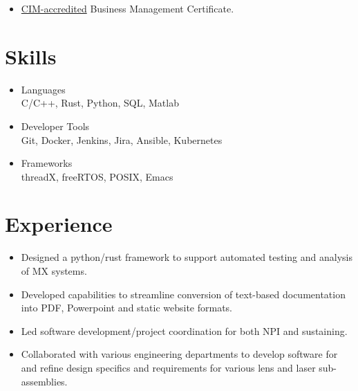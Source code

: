 \documentclass[a4paper,ragged2e,withhyper]{altacv}
\begin{document}
{\begin{itemize}
\item \href{https://acbsp.org/?}{CIM-accredited} Business Management Certificate.\\
\end{itemize}

\section{Skills}
\label{sec:org273d25d}
\begin{itemize}
\item Languages\\
C/C++, Rust, Python, SQL, Matlab\\
\item Developer Tools\\
Git, Docker, Jenkins, Jira, Ansible, Kubernetes\\
\item Frameworks\\
threadX, freeRTOS, POSIX, Emacs\\
\end{itemize}

}
\section{Experience}
\label{sec:orgcced417}


\begin{itemize}
\item Designed a python/rust framework to support automated testing and analysis of MX systems.\\
\item Developed capabilities to streamline conversion of text-based documentation into PDF, Powerpoint and static website formats.\\
\item Led software development/project coordination for both NPI and sustaining.\\
\item Collaborated with various engineering departments to develop software for and refine design specifics and requirements for various lens and laser sub-assemblies.\\
\end{itemize}
\end{document}
